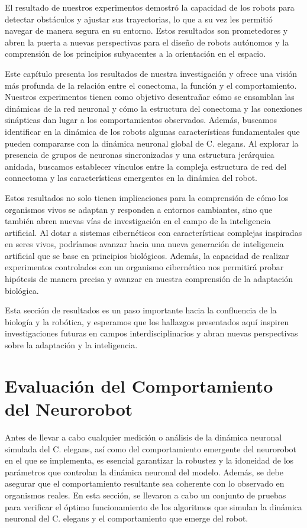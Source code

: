 El resultado de nuestros experimentos demostró la capacidad de los robots para detectar obstáculos y ajustar sus trayectorias, lo que a su vez les permitió navegar de manera segura en su entorno. Estos resultados son prometedores y abren la puerta a nuevas perspectivas para el diseño de robots autónomos y la comprensión de los principios subyacentes a la orientación en el espacio.

Este capítulo presenta los resultados de nuestra investigación y ofrece una visión más profunda de la relación entre el conectoma, la función y el comportamiento. Nuestros experimentos tienen como objetivo desentrañar cómo se ensamblan las dinámicas de la red neuronal y cómo la estructura del conectoma y las conexiones sinápticas dan lugar a los comportamientos observados. Además, buscamos identificar en la dinámica de los robots algunas características fundamentales que pueden compararse con la dinámica neuronal global de C. elegans. Al explorar la presencia de grupos de neuronas sincronizadas y una estructura jerárquica anidada, buscamos establecer vínculos entre la compleja estructura de red del connectoma y las características emergentes en la dinámica del robot.

Estos resultados no solo tienen implicaciones para la comprensión de cómo los organismos vivos se adaptan y responden a entornos cambiantes, sino que también abren nuevas vías de investigación en el campo de la inteligencia artificial. Al dotar a sistemas cibernéticos con características complejas inspiradas en seres vivos, podríamos avanzar hacia una nueva generación de inteligencia artificial que se base en principios biológicos. Además, la capacidad de realizar experimentos controlados con un organismo cibernético nos permitirá probar hipótesis de manera precisa y avanzar en nuestra comprensión de la adaptación biológica.

Esta sección de resultados es un paso importante hacia la confluencia de la biología y la robótica, y esperamos que los hallazgos presentados aquí inspiren investigaciones futuras en campos interdisciplinarios y abran nuevas perspectivas sobre la adaptación y la inteligencia.

 
\section{Evaluación del Comportamiento del Neurorobot}

Antes de llevar a cabo cualquier medición o análisis de la dinámica neuronal simulada del C. elegans, así como del comportamiento emergente del neurorobot en el que se implementa, es esencial garantizar la robustez y la idoneidad de los parámetros que controlan la dinámica neuronal del modelo. Además, se debe asegurar que el comportamiento resultante sea coherente con lo observado en organismos reales. En esta sección, se llevaron a cabo un conjunto de pruebas para verificar el óptimo funcionamiento de los algoritmos que simulan la dinámica neuronal del C. elegans y el comportamiento que emerge del robot.

